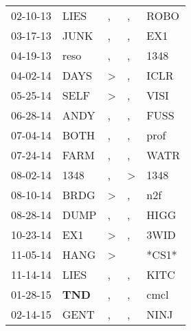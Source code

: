 \begin{supertabular}{p{0.07\textwidth}p{0.06\textwidth}p{0.02\textwidth}p{0.02\textwidth}p{0.06\textwidth}}
 02-10-13\textsuperscript{} &           LIES\textsuperscript{} &             , &             , &  ROBO\textsuperscript{} \\
 03-17-13\textsuperscript{} &           JUNK\textsuperscript{} &             , &             , &   EX1\textsuperscript{} \\
 04-19-13\textsuperscript{} &           reso\textsuperscript{} &             , &             , &  1348\textsuperscript{} \\
 04-02-14\textsuperscript{} &           DAYS\textsuperscript{} &  \textgreater &             , &  ICLR\textsuperscript{} \\
 05-25-14\textsuperscript{} &           SELF\textsuperscript{} &  \textgreater &             , &  VISI\textsuperscript{} \\
 06-28-14\textsuperscript{} &           ANDY\textsuperscript{} &             , &             , &  FUSS\textsuperscript{} \\
 07-04-14\textsuperscript{} &           BOTH\textsuperscript{} &             , &             , &  prof\textsuperscript{} \\
 07-24-14\textsuperscript{} &           FARM\textsuperscript{} &             , &             , &  WATR\textsuperscript{} \\
 08-02-14\textsuperscript{} &           1348\textsuperscript{} &             , &  \textgreater &  1348\textsuperscript{} \\
 08-10-14\textsuperscript{} &           BRDG\textsuperscript{} &  \textgreater &             , &   n2f\textsuperscript{} \\
 08-28-14\textsuperscript{} &           DUMP\textsuperscript{} &             , &             , &  HIGG\textsuperscript{} \\
 10-23-14\textsuperscript{} &            EX1\textsuperscript{} &  \textgreater &             , &  3WID\textsuperscript{} \\
 11-05-14\textsuperscript{} &           HANG\textsuperscript{} &  \textgreater &               &                   *CS1* \\
 11-14-14\textsuperscript{} &           LIES\textsuperscript{} &             , &             , &  KITC\textsuperscript{} \\
 01-28-15\textsuperscript{} &   \textbf{TND\textsuperscript{}} &             , &             , &  cmcl\textsuperscript{} \\
 02-14-15\textsuperscript{} &           GENT\textsuperscript{} &             , &             , &  NINJ\textsuperscript{} \\

\end{supertabular}
